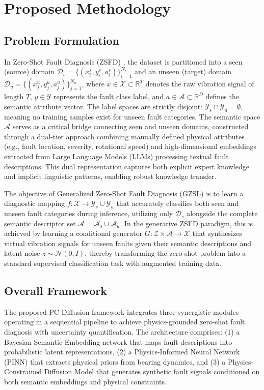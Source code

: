 \section{Proposed Methodology}
\label{sec:method}

\subsection{Problem Formulation}
In Zero-Shot Fault Diagnosis (ZSFD) \cite{zhang2023zero}, the dataset is partitioned into a seen (source) domain $\mathcal{D}_s = \{(x_i^s, y_i^s, a_i^s)\}_{i=1}^{N_s}$ and an unseen (target) domain $\mathcal{D}_u = \{(x_j^u, y_j^u, a_j^u)\}_{j=1}^{N_u}$, where $x \in \mathcal{X} \subset \mathbb{R}^T$ denotes the raw vibration signal of length $T$, $y \in \mathcal{Y}$ represents the fault class label, and $a \in \mathcal{A} \subset \mathbb{R}^D$ defines the semantic attribute vector. The label spaces are strictly disjoint: $\mathcal{Y}_s \cap \mathcal{Y}_u = \emptyset$, meaning no training samples exist for unseen fault categories. The semantic space $\mathcal{A}$ serves as a critical bridge connecting seen and unseen domains, constructed through a dual-tier approach combining manually defined physical attributes (e.g., fault location, severity, rotational speed) and high-dimensional embeddings extracted from Large Language Models (LLMs) processing textual fault descriptions. This dual representation captures both explicit expert knowledge and implicit linguistic patterns, enabling robust knowledge transfer.

The objective of Generalized Zero-Shot Fault Diagnosis (GZSL) is to learn a diagnostic mapping $f: \mathcal{X} \rightarrow \mathcal{Y}_s \cup \mathcal{Y}_u$ that accurately classifies both seen and unseen fault categories during inference, utilizing only $\mathcal{D}_s$ alongside the complete semantic descriptor set $\mathcal{A} = \mathcal{A}_s \cup \mathcal{A}_u$. In the generative ZSFD paradigm, this is achieved by learning a conditional generator $G: \mathcal{Z} \times \mathcal{A} \rightarrow \mathcal{X}$ that synthesizes virtual vibration signals for unseen faults given their semantic descriptions and latent noise $z \sim \mathcal{N}(0, I)$, thereby transforming the zero-shot problem into a standard supervised classification task with augmented training data.

\subsection{Overall Framework}
The proposed PC-Diffusion framework integrates three synergistic modules operating in a sequential pipeline to achieve physics-grounded zero-shot fault diagnosis with uncertainty quantification. The architecture comprises: (1) a Bayesian Semantic Embedding network that maps fault descriptions into probabilistic latent representations, (2) a Physics-Informed Neural Network (PINN) that extracts physical priors from bearing dynamics, and (3) a Physics-Constrained Diffusion Model that generates synthetic fault signals conditioned on both semantic embeddings and physical constraints.

